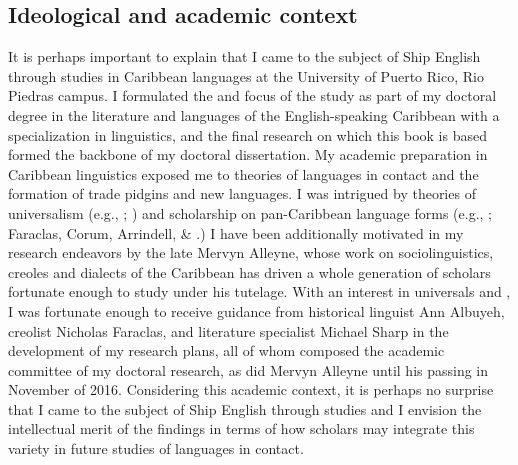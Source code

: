 \subsection{ {Ideological}  {and}  {academic}  {context}}

It is perhaps important to explain that I came to the subject of Ship English through studies in Caribbean languages at the University of Puerto Rico, Rio Piedras campus. I formulated the  and focus of the study as part of my doctoral degree in the literature and languages of the English-speaking Caribbean with a specialization in linguistics, and the final research on which this book is based formed the backbone of my doctoral dissertation. My academic preparation in Caribbean linguistics exposed me to theories of languages in contact and the formation of trade pidgins and new  languages. I was intrigued by theories of universalism (e.g., \citealt{MuyskenSmith1986}; \citealt{McWhorter2011}) and scholarship on pan-Caribbean language forms (e.g., \citealt{Allsopp2003}; Faraclas, Corum, Arrindell, \& \citealt{Ourdy2012}.) I have been additionally motivated in my research endeavors by the late Mervyn Alleyne, whose work on sociolinguistics, creoles and dialects of the Caribbean has driven a whole generation of scholars fortunate enough to study under his tutelage. With an interest in  universals and , I was fortunate enough to receive guidance from historical linguist Ann Albuyeh, creolist Nicholas Faraclas, and literature specialist Michael Sharp in the development of my research plans, all of whom composed the academic committee of my doctoral research, as did Mervyn Alleyne until his passing in November of 2016. Considering this academic context, it is perhaps no surprise that I came to the subject of Ship English through  studies and I envision the intellectual merit of the findings in terms of how scholars may integrate this variety in future studies of languages in contact.



